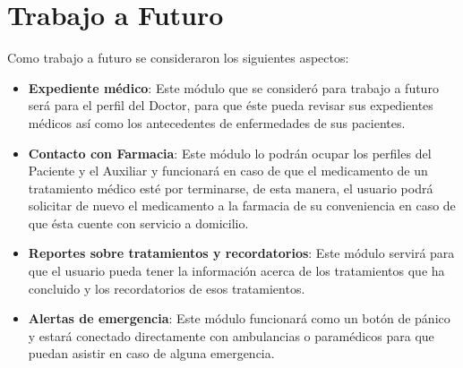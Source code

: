 \newpage
\section{Trabajo a Futuro}

Como trabajo a futuro se consideraron los siguientes aspectos:

\begin{itemize}
	
	\item \textbf{Expediente médico}: Este módulo que se consideró para trabajo a futuro será para el perfil del Doctor, para que éste pueda revisar sus expedientes médicos así como los antecedentes de enfermedades de sus pacientes.
	
	\item \textbf{Contacto con Farmacia}: Este módulo lo podrán ocupar los perfiles del Paciente y el Auxiliar y funcionará en caso de que el medicamento de un tratamiento médico esté por terminarse, de esta manera, el usuario podrá solicitar de nuevo el medicamento a la farmacia de su conveniencia en caso de que ésta cuente con servicio a domicilio.
	
	\item \textbf{Reportes sobre tratamientos y recordatorios}: Este módulo servirá para que el usuario pueda tener la información acerca de los tratamientos que ha concluido y los recordatorios de esos tratamientos.
	
	\item \textbf{Alertas de emergencia}: Este módulo funcionará como un botón de pánico y estará conectado directamente con ambulancias o paramédicos para que puedan asistir en caso de alguna emergencia.
	
%	
	 
\end{itemize}